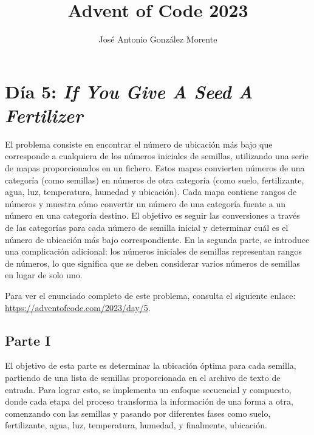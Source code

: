 \documentclass[a4paper,12pt]{article}
\title{Advent of Code 2023 }
\author{José Antonio González Morente}
\begin{document}
\maketitle
\tableofcontents

\section{Día 5: \textnormal{ \it If You Give A Seed A Fertilizer}}

El problema consiste en encontrar el número de ubicación más bajo que corresponde a cualquiera de los números iniciales de semillas, utilizando una serie de mapas proporcionados en un fichero. Estos mapas convierten números de una categoría (como semillas) en números de otra categoría (como suelo, fertilizante, agua, luz, temperatura, humedad y ubicación). Cada mapa contiene rangos de números y muestra cómo convertir un número de una categoría fuente a un número en una categoría destino. El objetivo es seguir las conversiones a través de las categorías para cada número de semilla inicial y determinar cuál es el número de ubicación más bajo correspondiente. En la segunda parte, se introduce una complicación adicional: los números iniciales de semillas representan rangos de números, lo que significa que se deben considerar varios números de semillas en lugar de solo uno.


Para ver el enunciado completo de este problema, consulta el siguiente enlace: 
\\
\href{https://adventofcode.com/2023/day/5}{https://adventofcode.com/2023/day/5}.

\subsection{Parte I}


El objetivo de esta parte es determinar la ubicación óptima para cada semilla, partiendo de una lista de semillas proporcionada en el archivo de texto de entrada. Para lograr esto, se implementa un enfoque secuencial y compuesto, donde cada etapa del proceso transforma la información de una forma a otra, comenzando con las semillas y pasando por diferentes fases como suelo, fertilizante, agua, luz, temperatura, humedad, y finalmente, ubicación.
\end{document}

